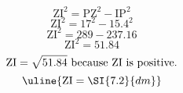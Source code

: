 \[\text{ZI}^{2}=\text{PZ}^{2}-\text{IP}^{2}\]
\[\text{ZI}^{2}=17^{2}-15.4^{2}\]
\[\text{ZI}^{2}=289-237.16\]
\[\text{ZI}^{2}=51.84\]
\[\text{ZI}=\sqrt{\mathstrut 51.84}\text{ because ZI is positive.}\]
\[\uline{\text{ZI}=\SI{7.2}{dm}}\]